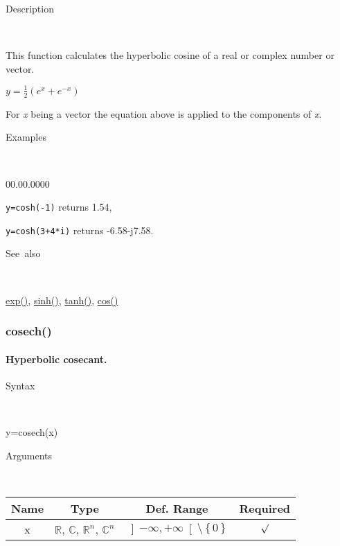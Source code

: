\begin{description}
\item [Description]~
\end{description}
This function calculates the hyperbolic cosine of a real or complex
number or vector.

\medskip{}
$y=\frac{1}{2}\left(e^{x}+e^{-x}\right)$ 
\medskip{}

For \textit{x} being a vector the equation above is applied
to the components of \textit{x}.

\begin{description}
\item [Examples]~
\end{description}
\begin{lyxlist}{00.00.0000}
\item [\texttt{y=cosh(-1)}]returns 1.54,
\item [\texttt{y=cosh(3+4{*}i)}]returns -6.58-j7.58.
\end{lyxlist}
\begin{description}
\item [See~also]~
\end{description}
\textcolor{blue}{\hyperlink{exp}{exp()}}\textcolor{black}{,} \textcolor{blue}{\hyperlink{sinh}{sinh()}}\textcolor{black}{,}
\textcolor{blue}{\hyperlink{tanh}{tanh()}}\textcolor{black}{,} \textcolor{blue}{\hyperlink{cos}{cos()}}


\newpage
\subsubsection*{\hypertarget{cosech}{}{\Large cosech()}}


\paragraph{\label{par:Hyperbolic-cosecant}Hyperbolic cosecant.}

\begin{description}
\item [Syntax]~
\end{description}
y=cosech(x)

\begin{description}
\item [Arguments]~
\end{description}
\begin{tabular}{|c|c|c|c|}
\hline 
Name&
Type&
Def. Range&
Required\tabularnewline
\hline
\hline 
x&
$\mathbb{R}$, $\mathbb{C}$, $\mathbb{R}^{n}$, $\mathbb{C}^{n}$&
$\left]-\infty,+\infty\right[$$\setminus\left\{ 0\right\} $&
$\surd$\tabularnewline
\hline
\end{tabular}

